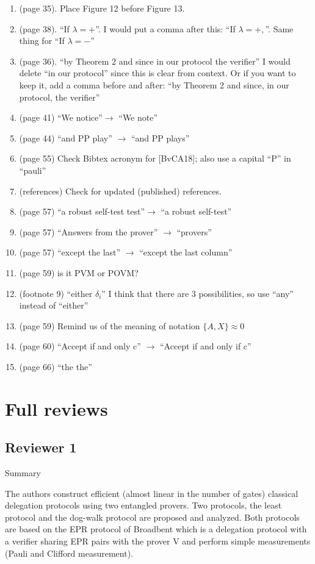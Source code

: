 \documentclass[12pt]{article}
\begin{document}
\begin{enumerate}
\item (page 35). Place Figure 12 before Figure 13.
\item (page 38). ``If $\lambda = +$''. I would put a comma after this: ``If $\lambda = +,$''. Same thing for ``If $\lambda = -$''
\item (page 36). ``by Theorem 2 and since in
our protocol the verifier'' I would delete ``in our protocol'' since this is clear from context. Or if you want to keep it, add a comma before and after: ``by Theorem 2 and since, in
our protocol, the verifier''
\item (page 41) ``We notice''$\rightarrow$ ``We note''
\item (page 44) ``and PP play'' $\rightarrow$ ``and PP plays''
\item (page 55) Check Bibtex acronym for [BvCA18]; also use a capital ``P'' in ``pauli''
\item (references) Check for updated (published) references.
\item (page 57) ``a robust self-test test''$\rightarrow$ ``a robust self-test''
\item (page 57) ``Answers from the prover'' $\rightarrow$ ``provers''
\item (page 57) ``except the last'' $\rightarrow$ ``except the last column''
\item (page 59) is it PVM or POVM?
\item (footnote 9) ``either $\delta_i$'' I think that there are 3 possibilities, so use ``any'' instead of ``either''
\item (page 59) Remind us of the meaning of notation $\{A,X\} \approx 0$
\item (page 60) ``Accept if and only c'' $\rightarrow$ ``Accept if and only if c''
\item (page 66) ``the the''
\end{enumerate}




\clearpage

\section{Full reviews}	
	\appendix
\subsection*{Reviewer 1}
Summary

The authors construct efficient (almost linear in the number of gates) classical delegation protocols using two entangled provers. Two protocols, the least protocol and the dog-walk protocol are proposed and analyzed. Both protocols are based on the EPR protocol of Broadbent which is a delegation protocol with a verifier sharing EPR pairs with the prover V and perform simple measurements (Pauli and Clifford measurement).
\end{document}
